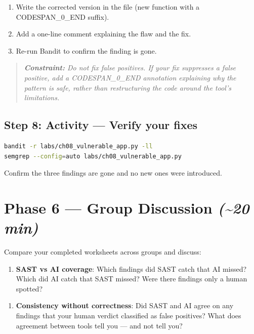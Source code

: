 \documentclass[11pt,a4paper]{book}
\begin{document}
\begin{enumerate}
  \item Write the corrected version in the file (new function with a CODESPAN\_0\_END suffix).
  \item Add a one-line comment explaining the flaw and the fix.
  \item Re-run Bandit to confirm the finding is gone.
\end{enumerate}

\begin{quote}
\textit{\textbf{Constraint:} Do not fix false positives. If your fix suppresses a false positive, add a CODESPAN\_0\_END annotation explaining why the pattern is safe, rather than restructuring the code around the tool's limitations.}
\end{quote}

\subsection{Step 8: Activity --- Verify your fixes}

\begin{lstlisting}[language=Bash]
bandit -r labs/ch08_vulnerable_app.py -ll
semgrep --config=auto labs/ch08_vulnerable_app.py
\end{lstlisting}

Confirm the three findings are gone and no new ones were introduced.

\medskip

\section{Phase 6 --- Group Discussion \textit{(\textasciitilde{}20 min)}}

Compare your completed worksheets across groups and discuss:

\begin{enumerate}
  \item \textbf{SAST vs AI coverage}: Which findings did SAST catch that AI missed? Which did AI catch that SAST missed? Were there findings only a human spotted?
\end{enumerate}

\begin{enumerate}
  \item \textbf{Consistency without correctness}: Did SAST and AI agree on any findings that your human verdict classified as false positives? What does agreement between tools tell you --- and not tell you?
\end{enumerate}
\end{document}
